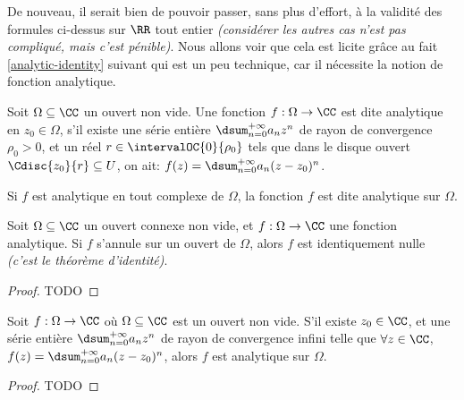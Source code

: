 De nouveau, il serait bien de pouvoir passer, sans plus d'effort, à la validité des formules ci-dessus sur $\RR$ tout entier \emph{(considérer les autres cas n'est pas compliqué, mais c'est pénible)}.
%
Nous allons voir que cela est licite grâce au fait \ref{analytic-identity} suivant qui est un peu technique, car il nécessite la notion de fonction analytique.




\begin{defi}
    Soit $\Omega \subseteq \CC$ un ouvert non vide.
	Une fonction $f: \Omega \rightarrow \CC$ est dite analytique en $z_0 \in \Omega$, 
	s'il existe
	une série entière $\dsum_{n = 0}^{+\infty} a_n z^n$
	de rayon de convergence $\rho_0 > 0$,
	et
	un réel $r \in \intervalOC{0}{\rho_0}$ tels que dans le disque ouvert $\Cdisc{z_0}{r} \subseteq U$, on ait:
	$f(z) = \dsum_{n = 0}^{+\infty} a_n (z - z_0)^n$.

	\smallskip
	
	Si $f$ est analytique en tout complexe de $\Omega$,
	la fonction $f$ est dite analytique sur $\Omega$.
\end{defi}




\begin{fact} \label{analytic-identity}
    Soit $\Omega \subseteq \CC$ un ouvert connexe non vide,
    et
    $f: \Omega \rightarrow \CC$ une fonction analytique.
	Si $f$ s'annule sur un ouvert de $\Omega$, alors $f$ est identiquement nulle
	\emph{(c'est le théorème d'identité)}.  
\end{fact}


\begin{proof}
	TODO
\end{proof}




\begin{fact} \label{power-series-vs-analytic}
    Soit $f: \Omega \rightarrow \CC$ où $\Omega \subseteq \CC$ est un ouvert non vide.
    S'il existe
    $z_0 \in \CC$,
    et
    une série entière $\dsum_{n = 0}^{+\infty} a_n z^n$ de rayon de convergence infini
    telle que
	$\forall z \in \CC$, $f(z) = \dsum_{n = 0}^{+\infty} a_n (z - z_0)^n$,
	alors
	$f$ est analytique sur $\Omega$. 
\end{fact}


\begin{proof}
	TODO
\end{proof}


